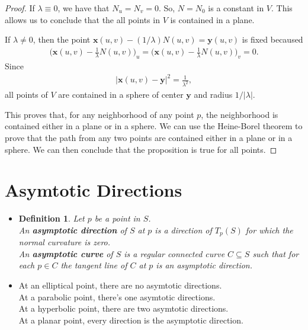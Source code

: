 \documentclass[10pt]{article}
\newtheorem{definition}[lemma]{Definition}
\newcommand{\ve}[1]{\mathbf{#1}}
\newcommand{\sseq}{\subseteq}
\begin{document}
\begin{itemize}
\begin{proof}
      If $\lambda \equiv 0$, we have that $N_u = N_v = 0$. So, $N = N_0$ is a constant in $V$. This allows us to conclude that the all points in $V$ is contained in a plane.

      If $\lambda \neq 0$, then the point $\ve{x}(u,v) - (1/\lambda)N(u,v) = \ve{y}(u,v)$ is fixed becaused
      \begin{align*}
        \bigg( \ve{x}(u,v) - \frac{1}{\lambda}N(u,v) \bigg)_u = \bigg( \ve{x}(u,v) - \frac{1}{\lambda}N(u,v) \bigg)_v = 0.
      \end{align*}
      Since
      \begin{align*}
        |\ve{x}(u,v) - \ve{y}|^2 = \frac{1}{\lambda^2},
      \end{align*}
      all points of $V$ are contained in a sphere of center $\ve{y}$ and radius $1/|\lambda|$.

      This proves that, for any neighborhood of any point $p$, the neighborhood is contained either in a plane or in a sphere. We can use the Heine-Borel theorem to prove that the path from any two points are contained either in a plane or in a sphere. We can then conclude that the proposition is true for all points.
    \end{proof}
  \end{itemize}

  \section{Asymtotic Directions}

  \begin{itemize}
    \item \begin{definition}
      Let $p$ be a point in $S$. \\
      An {\bf asymptotic direction} of $S$ at $p$ is a direction of $T_p(S)$ for which the normal curvature is zero.\\
      An {\bf asymptotic curve} of $S$ is a regular connected curve $C \sseq S$ such that for each $p \in C$ the tangent line of $C$ at $p$ is an asymptotic direction.
    \end{definition}

    \item At an elliptical point, there are no asymtotic directions.\\
    At a parabolic point, there's one asymtotic directions.\\
    At a hyperbolic point, there are two asymtotic directions.\\
    At a planar point, every direction is the asymptotic direction.    
  \end{itemize}
\end{document}
